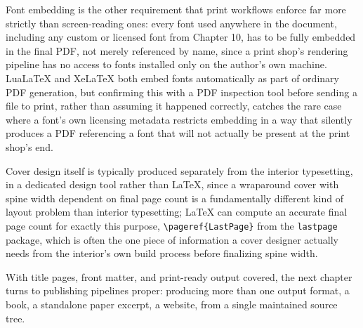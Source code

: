 Font embedding is the other requirement that print workflows enforce far more strictly than screen-reading ones: every font used anywhere in the document, including any custom or licensed font from Chapter 10, has to be fully embedded in the final PDF, not merely referenced by name, since a print shop's rendering pipeline has no access to fonts installed only on the author's own machine. LuaLaTeX and XeLaTeX both embed fonts automatically as part of ordinary PDF generation, but confirming this with a PDF inspection tool before sending a file to print, rather than assuming it happened correctly, catches the rare case where a font's own licensing metadata restricts embedding in a way that silently produces a PDF referencing a font that will not actually be present at the print shop's end.

Cover design itself is typically produced separately from the interior typesetting, in a dedicated design tool rather than LaTeX, since a wraparound cover with spine width dependent on final page count is a fundamentally different kind of layout problem than interior typesetting; LaTeX can compute an accurate final page count for exactly this purpose, \texttt{\textbackslash{}pageref\{LastPage\}} from the \texttt{lastpage} package, which is often the one piece of information a cover designer actually needs from the interior's own build process before finalizing spine width.

With title pages, front matter, and print-ready output covered, the next chapter turns to publishing pipelines proper: producing more than one output format, a book, a standalone paper excerpt, a website, from a single maintained source tree.
